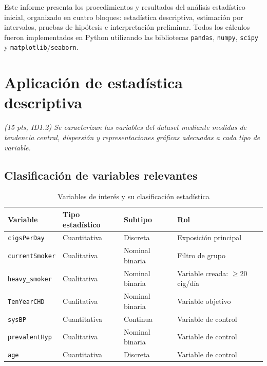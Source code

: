 \documentclass[11pt,a4paper]{article}
\newcommand{\guia}[1]{{\small\itshape\color{gris}#1}\par\vspace{0.15em}}
\begin{document}
Este informe presenta los procedimientos y resultados del análisis estadístico
inicial, organizado en cuatro bloques: estadística descriptiva, estimación por
intervalos, pruebas de hipótesis e interpretación preliminar. Todos los cálculos
fueron implementados en Python utilizando las bibliotecas \texttt{pandas},
\texttt{numpy}, \texttt{scipy} y \texttt{matplotlib}/\texttt{seaborn}.

\section{Aplicación de estadística descriptiva}
\label{sec:descriptiva}

\guia{(15 pts, ID1.2) Se caracterizan las variables del dataset mediante medidas de tendencia
central, dispersión y representaciones gráficas adecuadas a cada tipo de variable.}

\subsection{Clasificación de variables relevantes}

\begin{table}[H]
\centering
\caption{Variables de interés y su clasificación estadística}
\vspace{0.3em}
\begin{tabular}{llll}
\toprule
\textbf{Variable} & \textbf{Tipo estadístico} & \textbf{Subtipo} & \textbf{Rol} \\
\midrule
\texttt{cigsPerDay}     & Cuantitativa & Discreta       & Exposición principal \\
\texttt{currentSmoker}  & Cualitativa  & Nominal binaria & Filtro de grupo      \\
\texttt{heavy\_smoker}  & Cualitativa  & Nominal binaria & Variable creada: $\geq 20$ cig/día \\
\texttt{TenYearCHD}     & Cualitativa  & Nominal binaria & Variable objetivo    \\
\texttt{sysBP}          & Cuantitativa & Continua        & Variable de control  \\
\texttt{prevalentHyp}   & Cualitativa  & Nominal binaria & Variable de control  \\
\texttt{age}            & Cuantitativa & Discreta        & Variable de control  \\
\bottomrule
\end{tabular}
\end{table}
\end{document}
